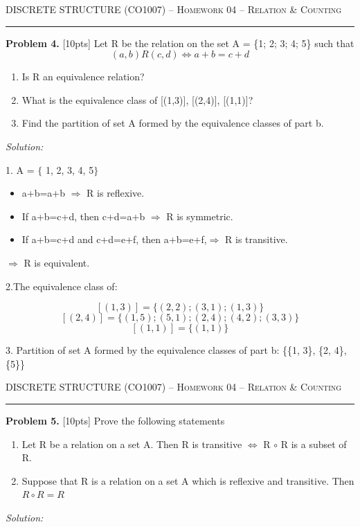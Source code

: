 \documentclass[12pt]{amsart}
\begin{document}
{\scshape } \hfill {\scshape DISCRETE STRUCTURE (CO1007) -- Homework 04 -- Relation \& Counting} \hfill {\scshape }
 
\smallskip

\hrule

\bigskip

\bigskip 

\textbf{Problem 4. }[10pts] Let R be the relation on the set A = \{1; 2; 3; 4; 5\} such that\[(a,b)R(c,d) 	\Leftrightarrow a + b = c + d \]
\begin{enumerate}
    \item Is R an equivalence relation?
    \item What is the equivalence class of [(1,3)], [(2,4)], [(1,1)]?
    \item Find the partition of set A formed by the equivalence classes of part b.
\end{enumerate}
\bigskip
\textit{Solution:}
\medskip
 
 1. A = $ \{ $ 1, 2, 3, 4, 5$ \}$
 \begin{itemize}

    \item a+b=a+b $\Rightarrow$ R is reflexive.
    \item If a+b=c+d, then c+d=a+b $\Rightarrow$ R is symmetric.
    \item If a+b=c+d and c+d=e+f, then a+b=e+f,$\Rightarrow$ R is transitive.
\end{itemize}
  $\Rightarrow$ R is equivalent.
  
 2.The equivalence class of: 

\[[(1, 3)] = \{(2, 2); (3, 1); (1,3)\}\]
\[[(2, 4)] = \{(1, 5); (5, 1); (2,4); (4,2); (3, 3)\}\]
\[[(1,1)] = \{(1, 1)\}\]

3. Partition of set A formed by the equivalence classes of part b: \{\{1, 3\}, \{2, 4\}, \{5\}\}

\newpage

{\scshape } \hfill {\scshape DISCRETE STRUCTURE (CO1007) -- Homework 04 -- Relation \& Counting} \hfill {\scshape }
 
\smallskip

\hrule

\bigskip

\bigskip 

\textbf{Problem 5. }[10pts] Prove the following statements
\begin{enumerate}
    \item Let R be a relation on a set A. Then R is transitive $\Leftrightarrow$ R $\circ$ R is a subset of R. 
    \item Suppose that R is a relation on a set A which is reflexive and transitive. Then $R\circ R = R$
\end{enumerate}
\bigskip
\textit{Solution:}
\medskip
\end{document}
